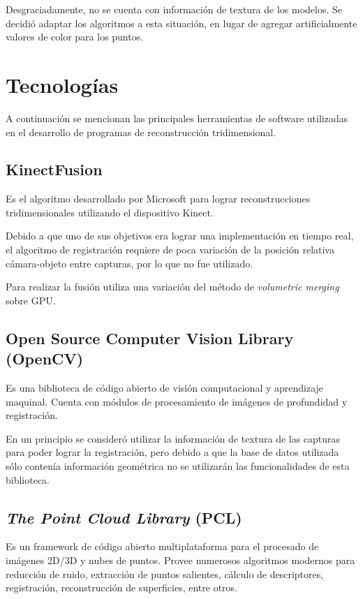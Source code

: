 

Desgraciadamente, no se cuenta con información de textura de los modelos.
Se decidió adaptar los algoritmos a esta situación, en lugar de agregar
artificialmente valores de color para los puntos.


\section{Tecnologías}
	A continuación se mencionan las principales herramientas de software
	utilizadas en el desarrollo de programas de reconstrucción tridimensional.

	\subsection{KinectFusion}
	Es el algoritmo desarrollado por Microsoft para lograr reconstrucciones
	tridimensionales utilizando el dispositivo Kinect.

	Debido a que uno de sus objetivos era lograr una implementación en tiempo
	real, el algoritmo de registración requiere de poca variación
	de la posición relativa cámara-objeto entre capturas, por lo que no fue utilizado.

	Para realizar la fusión utiliza una variación del método de
	\emph{volumetric merging} sobre GPU.\cite{Izadi:2011:KRR:2047196.2047270}

	\subsection{Open Source Computer Vision Library (OpenCV)}
	Es una biblioteca de código abierto de visión computacional y aprendizaje
	maquinal.  Cuenta con módulos de procesamiento de imágenes de profundidad y
	registración.

	En un principio se consideró utilizar la información de textura de las
	capturas para poder lograr la registración, pero debido a que la base de
	datos utilizada sólo contenía información geométrica  no se utilizarán las
	funcionalidades de esta biblioteca.

	\subsection{\emph{The Point Cloud Library} (PCL)}
	Es un framework de código abierto multiplataforma para el procesado de
	imágenes 2D/3D y nubes de puntos.
	Provee numerosos algoritmos modernos para reducción de ruido, extracción de
	puntos salientes, cálculo de descriptores, registración, reconstrucción de
	superficies, entre otros.

